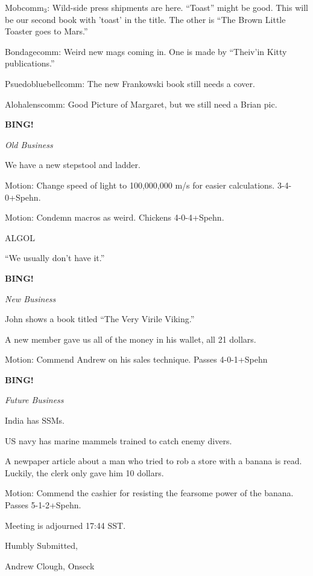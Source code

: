 \documentclass[12pt]{article}
\newcommand{\bing}{{\bf BING!} }
\newcommand{\goto}[1]{\bing \vskip 12pt \centerline{{\em{#1}}}}
\begin{document}
Mobcomm$_3$:  Wild-side press shipments are here.  ``Toast'' might be good.  This will be our second book with 'toast' in the title.  The other is ``The Brown Little Toaster goes to Mars.''

Bondagecomm:  Weird new mags coming in.  One is made by ``Theiv'in Kitty publications.''

Psuedobluebellcomm:  The new Frankowski book still needs a cover.

Alohalenscomm:  Good Picture of Margaret, but we still need a Brian pic.

\goto{Old Business}

We have a new stepstool and ladder.

Motion:  Change speed of light to 100,000,000 m/s for easier calculations.  3-4-0+Spehn.

Motion:  Condemn macros as weird.  Chickens 4-0-4+Spehn.

ALGOL

``We usually don't have it.''

\goto{New Business}

John shows a book titled ``The Very Virile Viking.''

A new member gave us all of the money in his wallet, all 21 dollars.

Motion:  Commend Andrew on his sales technique.  Passes 4-0-1+Spehn

\goto{Future Business}

India has SSMs.

US navy has marine mammels trained to catch enemy divers.

A newpaper article about a man who tried to rob a store with a banana is read.  Luckily, the clerk only gave him 10 dollars.

Motion: Commend the cashier for resisting the fearsome power of the banana.  Passes 5-1-2+Spehn.

\vspace{12pt}

\noindent
Meeting is adjourned 17:44 SST.

\vspace{18pt}

\centerline{Humbly Submitted,}
\centerline{Andrew Clough, Onseck}
\end{document}
